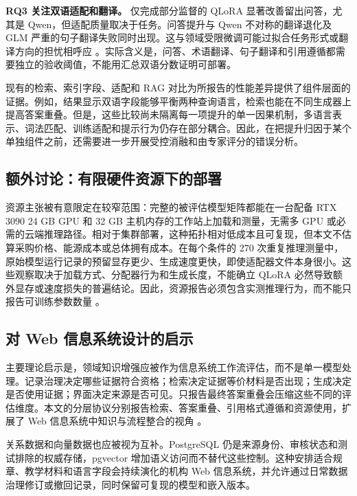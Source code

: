 \textbf{RQ3 关注双语适配和翻译。} 仅完成部分监督的 QLoRA 显著改善留出问答，尤其是 Qwen，但适配质量取决于任务。问答提升与 Qwen 不对称的翻译退化及 GLM 严重的句子翻译失败同时出现。这与领域受限微调可能过拟合任务形式或翻译方向的担忧相呼应 \citep{hu2024translation,vieira2024translation}。实际含义是，问答、术语翻译、句子翻译和引用遵循都需要独立的验收阈值，不能用汇总双语分数证明可部署。

现有的检索、索引字段、适配和 RAG 对比为所报告的性能差异提供了组件层面的证据。例如，结果显示双语字段能够平衡两种查询语言，检索也能在不同生成器上提高答案重叠。但是，这些比较尚未隔离每一项提升的单一因果机制，多语言表示、词法匹配、训练适配和提示行为仍存在部分耦合。因此，在把提升归因于某个单独组件之前，还需要进一步开展受控消融和由专家评分的错误分析。

\subsection{额外讨论：有限硬件资源下的部署}

资源主张被有意限定在较窄范围：完整的被评估模型矩阵都能在一台配备 RTX 3090 24 GB GPU 和 32 GB 主机内存的工作站上加载和测量，无需多 GPU 或必需的云端推理路径。相对于集群部署，这种拓扑相对低成本且可复现，但本文不估算采购价格、能源成本或总体拥有成本。在每个条件的 270 次重复推理测量中，原始模型运行记录的预留显存更少、生成速度更快，即使适配器文件本身很小。这些观察取决于加载方式、分配器行为和生成长度，不能确立 QLoRA 必然导致额外显存或速度损失的普遍结论。因此，资源报告必须包含实测推理行为，而不能只报告可训练参数数量 \citep{schwartz2020green,ding2023peft,lv2024full}。

\subsection{对 Web 信息系统设计的启示}

主要理论启示是，领域知识增强应被作为信息系统工作流评估，而不是单一模型处理。记录治理决定哪些证据符合资格；检索决定证据等价材料是否出现；生成决定是否使用证据；界面决定来源是否可见。只报告最终答案重叠会压缩这些不同的评估维度。本文的分层协议分别报告检索、答案重叠、引用格式遵循和资源使用，扩展了 Web 信息系统中知识与流程整合的视角 \citep{hubscher2021knowledge,yang2024legalqa}。

关系数据和向量数据也应被视为互补。PostgreSQL 仍是来源身份、审核状态和测试排除的权威存储，pgvector 增加语义访问而不替代这些控制。这种安排适合规章、教学材料和语言字段会持续演化的机构 Web 信息系统，并允许通过日常数据治理修订或撤回记录，同时保留可复现的模型和嵌入版本。

